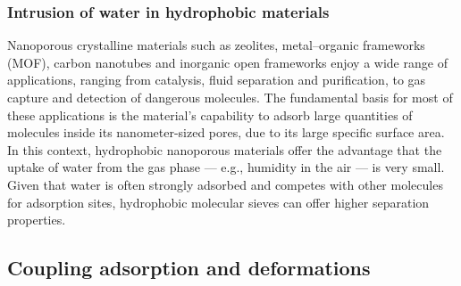 \documentclass[thesis]{subfiles}
\begin{document}
\subsubsection{Intrusion of water in hydrophobic materials}

Nanoporous crystalline materials such as zeolites, metal--organic frameworks
(MOF), carbon nanotubes and inorganic open frameworks enjoy a wide range of
applications, ranging from catalysis, fluid separation and purification, to gas
capture and detection of dangerous molecules. The fundamental basis for most of
these applications is the material's capability to adsorb large quantities of
molecules inside its nanometer-sized pores, due to its large specific surface
area. In this context, hydrophobic nanoporous materials offer the advantage that
the uptake of water from the gas phase --- e.g., humidity in the air --- is very
small\cite{Wu2010, Ghosh2014, Wang2016}. Given that water is often strongly
adsorbed and competes with other molecules for adsorption sites, hydrophobic
molecular sieves can offer higher separation properties\cite{Flanigen1978,
Giaya2000}.

\subsection{Coupling adsorption and deformations}


\OnlyInSubfile{\printbibliography}
\end{document}
